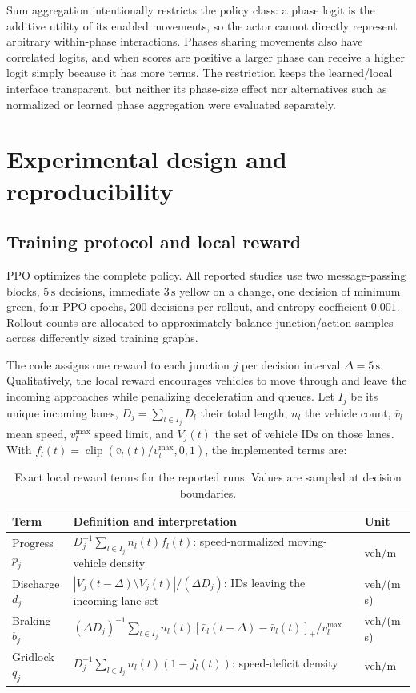 \documentclass[10pt,a4paper]{article}
\newcommand{\reportcontentwidth}{0.82\linewidth}
\begin{document}
Sum aggregation intentionally restricts the policy class: a phase logit is the additive utility of its enabled movements, so the actor cannot directly represent arbitrary within-phase interactions.
Phases sharing movements also have correlated logits, and when scores are positive a larger phase can receive a higher logit simply because it has more terms.
The restriction keeps the learned/local interface transparent, but neither its phase-size effect nor alternatives such as normalized or learned phase aggregation were evaluated separately.

\section{Experimental design and reproducibility}

\subsection{Training protocol and local reward}

PPO \cite{schulman2017ppo} optimizes the complete policy.
All reported studies use two message-passing blocks, \(5\,\mathrm{s}\) decisions, immediate \(3\,\mathrm{s}\) yellow on a change, one decision of minimum green, four PPO epochs, 200 decisions per rollout, and entropy coefficient \(0.001\).
Rollout counts are allocated to approximately balance junction/action samples across differently sized training graphs.

The code assigns one reward to each junction \(j\) per decision interval \(\Delta=5\,\mathrm{s}\).
Qualitatively, the local reward encourages vehicles to move through and leave the incoming approaches while penalizing deceleration and queues.
Let \(I_j\) be its unique incoming lanes, \(D_j=\sum_{l\in I_j}D_l\) their total length, \(n_l\) the vehicle count, \(\bar v_l\) mean speed, \(v_l^{\max}\) speed limit, and \(V_j(t)\) the set of vehicle IDs on those lanes.
With \(f_l(t)=\operatorname{clip}(\bar v_l(t)/v_l^{\max},0,1)\), the implemented terms are:

\begin{table}[H]
  \footnotesize
  \centering
  \caption{Exact local reward terms for the reported runs. Values are sampled at decision boundaries.}
  \begin{tabularx}{\reportcontentwidth}{@{}lXl@{}}
    \toprule
    Term & Definition and interpretation & Unit\\
    \midrule
    Progress \(p_j\) & \(D_j^{-1}\sum_{l\in I_j}n_l(t)f_l(t)\): speed-normalized moving-vehicle density & veh/m\\
    Discharge \(d_j\) & \(|V_j(t-\Delta)\setminus V_j(t)|/(\Delta D_j)\): IDs leaving the incoming-lane set & veh/(m\,s)\\
    Braking \(b_j\) & \((\Delta D_j)^{-1}\sum_{l\in I_j}n_l(t)[\bar v_l(t-\Delta)-\bar v_l(t)]_+/v_l^{\max}\) & veh/(m\,s)\\
    Gridlock \(q_j\) & \(D_j^{-1}\sum_{l\in I_j}n_l(t)(1-f_l(t))\): speed-deficit density & veh/m\\
    \bottomrule
  \end{tabularx}
  \label{tab:reward}
\end{table}
\end{document}
